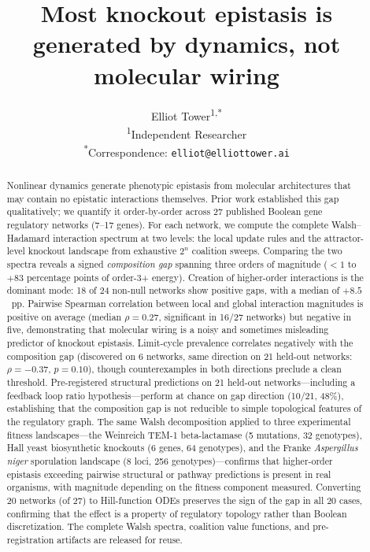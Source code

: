 \documentclass[10pt]{article}
\title{Most knockout epistasis is generated by dynamics, not molecular wiring}
\author{
  Elliot Tower\textsuperscript{1,*} \\[4pt]
  \small\textsuperscript{1}Independent Researcher \\
  \small\textsuperscript{*}Correspondence: \texttt{elliot@elliottower.ai}
}
\begin{document}
\maketitle
\linenumbers
\doublespacing

\begin{abstract}
Nonlinear dynamics generate phenotypic epistasis from molecular
architectures that may contain no epistatic interactions themselves.
Prior work established this gap qualitatively; we quantify it
order-by-order across 27 published Boolean gene regulatory networks
(7--17 genes). For each network, we compute the complete
Walsh--Hadamard interaction spectrum at two levels: the local update
rules and the attractor-level knockout landscape from exhaustive
$2^n$ coalition sweeps. Comparing the two spectra reveals a signed
\emph{composition gap} spanning three orders of magnitude ($< 1$ to
$+83$ percentage points of order-3+ energy). Creation of higher-order
interactions is the dominant mode: 18 of 24 non-null networks show
positive gaps, with a median of $+8.5$~pp. Pairwise Spearman
correlation between local and global interaction magnitudes is positive
on average (median $\rho = 0.27$, significant in 16/27 networks) but
negative in five, demonstrating that molecular wiring is a noisy and
sometimes misleading predictor of knockout epistasis. Limit-cycle prevalence correlates negatively with the composition gap
(discovered on 6 networks, same direction on 21 held-out networks:
$\rho = -0.37$, $p = 0.10$), though counterexamples in both
directions preclude a clean threshold. Pre-registered structural
predictions on 21 held-out networks---including a feedback loop ratio
hypothesis---perform at chance on gap direction (10/21, 48\%),
establishing that the composition gap is not reducible to simple
topological features of the regulatory graph. The same Walsh
decomposition applied to three experimental fitness landscapes---the
Weinreich TEM-1 beta-lactamase (5 mutations, 32 genotypes), Hall
yeast biosynthetic knockouts (6 genes, 64 genotypes), and the
Franke \emph{Aspergillus niger} sporulation landscape (8 loci,
256 genotypes)---confirms that higher-order epistasis exceeding
pairwise structural or pathway predictions is present in real
organisms, with magnitude depending on the fitness component
measured. Converting 20 networks (of 27) to
Hill-function ODEs preserves the sign of the gap in all 20 cases,
confirming that the effect is a property of
regulatory topology rather than Boolean discretization. The complete Walsh spectra, coalition value functions, and
pre-registration artifacts are released for reuse.
\end{abstract}
\end{document}
